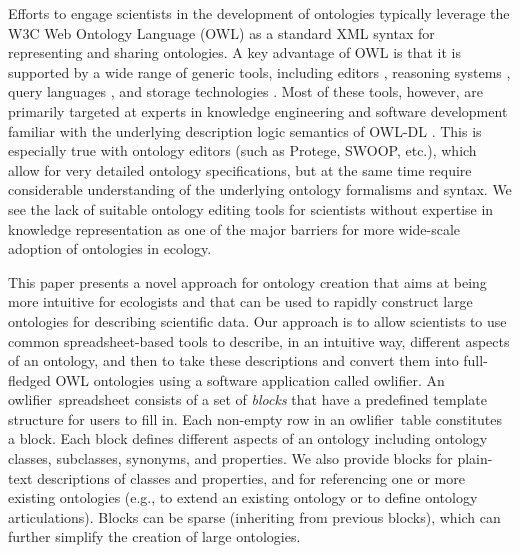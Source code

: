 \documentclass[5p,authoryear]{elsarticle}
\newcommand{\owlifier}{\textsf{owlifier}}
\begin{document}
Efforts to engage scientists in the development of ontologies
typically leverage the W3C Web Ontology Language (OWL)
\cite{smith04:_owl_web_ontol_languag_guide} as a standard XML syntax
for representing and sharing ontologies. A key advantage of OWL is
that it is supported by a wide range of generic tools, including
editors
\cite{knublauch04:_editin_descr_logic_ontol_with,kalyanpur05:_swoop},
reasoning systems
\cite{sirin07:_pellet,tsarkov06:_fact_descr_logic_reason}, query
languages
\cite{prudhommeaux08:_sparq_query_languag_for_rdf,motik05:_query_answer_for_owl_dl_with_rules},
and storage technologies
\cite{carroll04:_jena,broekstra02:_sesam}. Most of these tools,
however, are primarily targeted at experts in knowledge engineering
and software development familiar with the underlying description
logic semantics of OWL-DL \cite{grau08:_owl}. This is especially true
with ontology editors (such as Protege, SWOOP, etc.), which allow for
very detailed ontology specifications, but at the same time require
considerable understanding of the underlying ontology formalisms and
syntax. We see the lack of suitable ontology editing tools for
scientists without expertise in knowledge representation as one of the
major barriers for more wide-scale adoption of ontologies in ecology.


This paper presents a novel approach for ontology creation that aims
at being more intuitive for ecologists and that can be used to rapidly
construct large ontologies for describing scientific data. Our
approach is to allow scientists to use common spreadsheet-based tools
to describe, in an intuitive way, different aspects of an ontology,
and then to take these descriptions and convert them into full-fledged
OWL ontologies using a software application called \owlifier. An
\owlifier\ spreadsheet consists of a set of \emph{blocks} that have a
predefined template structure for users to fill in. Each non-empty row
in an \owlifier\ table constitutes a block. Each block defines
different aspects of an ontology including ontology classes,
subclasses, synonyms, and properties.  We also provide blocks for
plain-text descriptions of classes and properties, and for referencing
one or more existing ontologies (e.g., to extend an existing ontology
or to define ontology articulations). Blocks can be sparse (inheriting
from previous blocks), which can further simplify the creation of
large ontologies.
\end{document}
